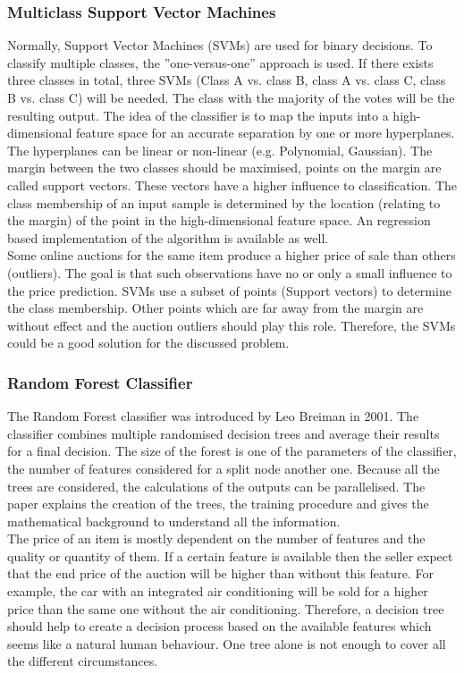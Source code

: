 \subsubsection{Multiclass Support Vector Machines}
Normally, Support Vector Machines (SVMs)\cite{svc} are used for binary decisions. To classify multiple classes, the ''one-versus-one'' approach is used. If there exists three classes in total, three SVMs (Class A vs. class B, class A vs. class C, class B vs. class C) will be needed. The class with the majority of the votes will be the resulting output. The idea of the classifier is to map the inputs into a high-dimensional feature space for an accurate separation by one or more hyperplanes. The hyperplanes can be linear or non-linear (e.g. Polynomial, Gaussian). The margin between the two classes should be maximised, points on the margin are called support vectors. These vectors have a higher influence to classification. The class membership of an input sample is determined by the location (relating to the margin) of the point in the high-dimensional feature space. An regression based implementation of the algorithm is available as well\cite{svr}.\\
Some online auctions for the same item produce a higher price of sale than others (outliers). The goal is that such observations have no or only a small influence to the price prediction. SVMs use a subset of points (Support vectors) to determine the class membership. Other points which are far away from the margin are without effect and the auction outliers should play this role. Therefore, the SVMs could be a good solution for the discussed problem. 
\subsubsection{Random Forest Classifier}
The Random Forest classifier was introduced by Leo Breiman in 2001\cite{breiman}. The classifier combines multiple randomised decision trees and average their results for a final decision. The size of the forest is one of the parameters of the classifier, the number of features considered for a split node another one. Because all the trees are considered, the calculations of the outputs can be parallelised. The paper explains the creation of the trees, the training procedure and gives the mathematical background to understand all the information. \\
The price of an item is mostly dependent on the number of features and the quality or quantity of them. If a certain feature is available then the seller expect that the end price of the auction will be higher than without this feature. For example, the car with an integrated air conditioning will be sold for a higher price than the same one without the air conditioning. Therefore, a decision tree should help to create a decision process based on the available features which seems like a natural human behaviour. One tree alone is not enough to cover all the different circumstances. 
